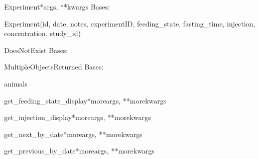 \documentclass[letterpaper,10pt,english]{sphinxmanual}
\begin{document}
\hypertarget{data.models.Experiment}{}\begin{classdesc}{Experiment}{*args, **kwargs}
Bases: 

Experiment(id, date, notes, experimentID, feeding\_state, fasting\_time, injection, concentration, study\_id)

\hypertarget{data.models.Experiment.DoesNotExist}{}\begin{excdesc}{DoesNotExist}
Bases: 
\end{excdesc}

\hypertarget{data.models.Experiment.MultipleObjectsReturned}{}\begin{excdesc}{MultipleObjectsReturned}
Bases: 
\end{excdesc}

\hypertarget{data.models.Experiment.animals}{}\begin{memberdesc}[Experiment]{animals}\end{memberdesc}

\hypertarget{data.models.Experiment.get\_feeding\_state\_display}{}\begin{methoddesc}[Experiment]{get\_feeding\_state\_display}{*moreargs, **morekwargs}\end{methoddesc}

\hypertarget{data.models.Experiment.get\_injection\_display}{}\begin{methoddesc}[Experiment]{get\_injection\_display}{*moreargs, **morekwargs}\end{methoddesc}

\hypertarget{data.models.Experiment.get\_next\_by\_date}{}\begin{methoddesc}[Experiment]{get\_next\_by\_date}{*moreargs, **morekwargs}\end{methoddesc}

\hypertarget{data.models.Experiment.get\_previous\_by\_date}{}\begin{methoddesc}[Experiment]{get\_previous\_by\_date}{*moreargs, **morekwargs}\end{methoddesc}


\end{classdesc}
\end{document}
